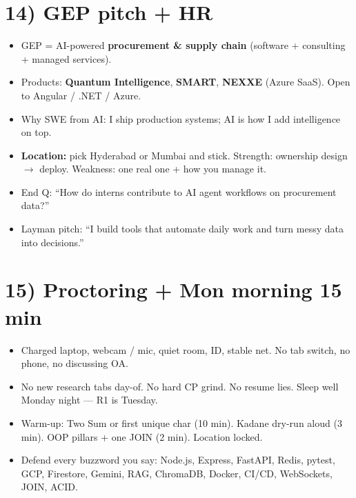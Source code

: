 \documentclass[a4paper,9pt]{extarticle}
\begin{document}
\section{14) GEP pitch + HR}
\begin{itemize}
  \item GEP = AI-powered \textbf{procurement \& supply chain} (software + consulting + managed services).
  \item Products: \textbf{Quantum Intelligence}, \textbf{SMART}, \textbf{NEXXE} (Azure SaaS). Open to Angular / .NET / Azure.
  \item Why SWE from AI: I ship production systems; AI is how I add intelligence on top.
  \item \textbf{Location:} pick Hyderabad or Mumbai and stick. Strength: ownership design $\to$ deploy. Weakness: one real one + how you manage it.
  \item End Q: ``How do interns contribute to AI agent workflows on procurement data?''
  \item Layman pitch: ``I build tools that automate daily work and turn messy data into decisions.''
\end{itemize}

\section{15) Proctoring + Mon morning 15 min}
\begin{itemize}
  \item Charged laptop, webcam / mic, quiet room, ID, stable net. No tab switch, no phone, no discussing OA.
  \item No new research tabs day-of. No hard CP grind. No resume lies. Sleep well Monday night --- R1 is Tuesday.
  \item Warm-up: Two Sum or first unique char (10 min). Kadane dry-run aloud (3 min). OOP pillars + one JOIN (2 min). Location locked.
  \item Defend every buzzword you say: Node.js, Express, FastAPI, Redis, pytest, GCP, Firestore, Gemini, RAG, ChromaDB, Docker, CI/CD, WebSockets, JOIN, ACID.
\end{itemize}

\vspace{1mm}
\end{document}
